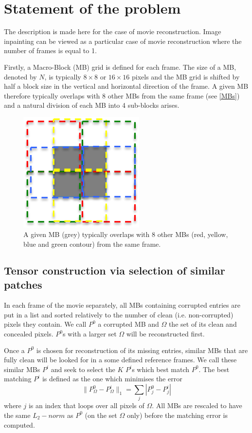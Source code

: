 \documentclass[a4paper, 11pt]{article} %
\def \bee {\begin{equation}}
\def \eee {\end{equation}}
\def \t {\times}
\begin{document}
\section{Statement of the problem}
The description is made here for the case of movie reconstruction. Image inpainting can be viewed as a particular case of movie reconstruction where the number of frames is equal to 1.

Firstly, a Macro-Block (MB) grid is defined for each frame. The size of a MB, denoted by $N$, is typically  $8\t 8$ or $16\t 16$ pixels and the MB grid is shifted by half a block size in the vertical and horizontal direction of the frame. A given MB therefore typically overlaps with 8 other MBs from the same frame (see \autoref{MBs}) and a natural division of each MB into 4 sub-blocks arises. 

\begin{figure}[h!]
\centering
\includegraphics[scale=0.6]{MBs}
\caption{A given MB (grey) typically overlaps with 8 other MBs (red, yellow, blue and green contour) from the same frame.  \label{MBs}}
\end{figure}
\subsection{Tensor construction via selection of similar patches}

In each frame of the movie separately, all MBs containing corrupted entries are put in a list and sorted relatively to the number of clean (i.e. non-corrupted) pixels they contain.
We call $P^0$ a corrupted MB and $\Omega$ the set of its clean and concealed pixels.
$P^0$s with a larger set $\Omega$ will be reconstructed first.

Once a $P^0$ is chosen for reconstruction of its missing entries, similar MBs that are fully clean will be looked for in a some defined reference frames. We call these similar MBs $P^i$ and seek to select the $K$  $P^i$s which best match $P^0$. The best matching $P^i$ is defined as the one which minimises the error
\bee
\| P_{\Omega}^0-P_{\Omega}^i\|_1=\sum \limits_{j} |P^0_j-P^i_j|
\label{ErrorMatching}
\eee
where $j$ is an index that loops over all pixels of $\Omega$. All MBs are rescaled to have the same $L_2-norm$ as $P^0$ (on the set $\Omega$ only) before the matching error is computed. 
\end{document}
